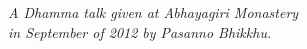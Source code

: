 
\vspace*{3\baselineskip}

{\centering

{\Large\chapterTitleFont\scshape\thetitle}
\medskip

{\itshape
A Dhamma talk given at Abhayagiri Monastery\\
in September of 2012 by Pasanno Bhikkhu.}
\bigskip

}

